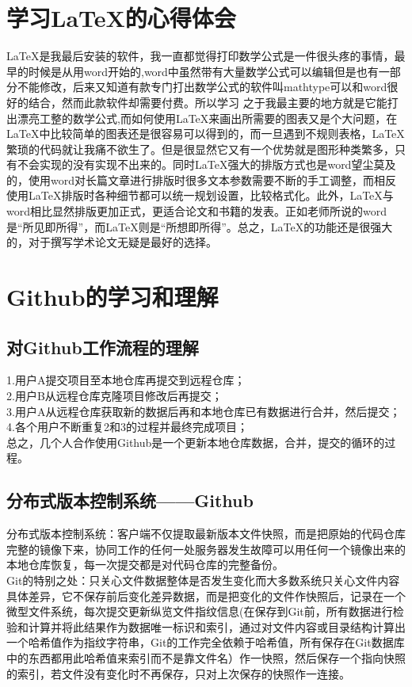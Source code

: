 \documentclass[12pt]{article}
\begin{document}
\begin{flushleft}
\begin{flushleft}
\begin{flushleft}
\begin{flushleft}
\section{学习\LaTeX{}的心得体会}
\LaTeX{}是我最后安装的软件，我一直都觉得打印数学公式是一件很头疼的事情，最早的时候是从用word开始的,word中虽然带有大量数学公式可以编辑但是也有一部分不能修改，后来又知道有款专门打出数学公式的软件叫mathtype可以和word很好的结合，然而此款软件却需要付费。所以学习\Latex{} 之于我最主要的地方就是它能打出漂亮工整的数学公式,而如何使用\LaTeX{}来画出所需要的图表又是个大问题，在\LaTeX{}中比较简单的图表还是很容易可以得到的，而一旦遇到不规则表格，\LaTeX{}繁琐的代码就让我痛不欲生了。但是很显然它又有一个优势就是图形种类繁多，只有不会实现的没有实现不出来的。同时\LaTeX{}强大的排版方式也是word望尘莫及的，使用word对长篇文章进行排版时很多文本参数需要不断的手工调整，而相反使用\LaTeX{}排版时各种细节都可以统一规划设置，比较格式化。此外，\LaTeX{}与word相比显然排版更加正式，更适合论文和书籍的发表。正如老师所说的word是``所见即所得''，而\LaTeX{}则是``所想即所得''。总之，\LaTeX{}的功能还是很强大的，对于撰写学术论文无疑是最好的选择。
\section{Github的学习和理解}
\subsection{对Github工作流程的理解}
\begin{flushleft}
1.用户A提交项目至本地仓库再提交到远程仓库；\\
2.用户B从远程仓库克隆项目修改后再提交；\\
3.用户A从远程仓库获取新的数据后再和本地仓库已有数据进行合并，然后提交；\\
4.各个用户不断重复2和3的过程并最终完成项目；\\
总之，几个人合作使用Github是一个更新本地仓库数据，合并，提交的循环的过程。
\end{flushleft}
\subsection{分布式版本控制系统——Github}
\begin{flushleft}
{\color{blue}分布式版本控制系统：}客户端不仅提取最新版本文件快照，而是把原始的代码仓库完整的镜像下来，协同工作的任何一处服务器发生故障可以用任何一个镜像出来的本地仓库恢复，每一次提交都是对代码仓库的完整备份。\\
{\color{blue}Git的特别之处：}只关心文件数据整体是否发生变化而大多数系统只关心文件内容具体差异，它不保存前后变化差异数据，而是把变化的文件作快照后，记录在一个微型文件系统，每次提交更新纵览文件指纹信息(在保存到Git前，所有数据进行检验和计算并将此结果作为数据唯一标识和索引，通过对文件内容或目录结构计算出一个哈希值作为指纹字符串，Git的工作完全依赖于哈希值，所有保存在Git数据库中的东西都用此哈希值来索引而不是靠文件名）作一快照，然后保存一个指向快照的索引，若文件没有变化时不再保存，只对上次保存的快照作一连接。\\
\end{flushleft}

\end{flushleft}
\end{flushleft}
\end{flushleft}
\end{flushleft}
\end{document}
